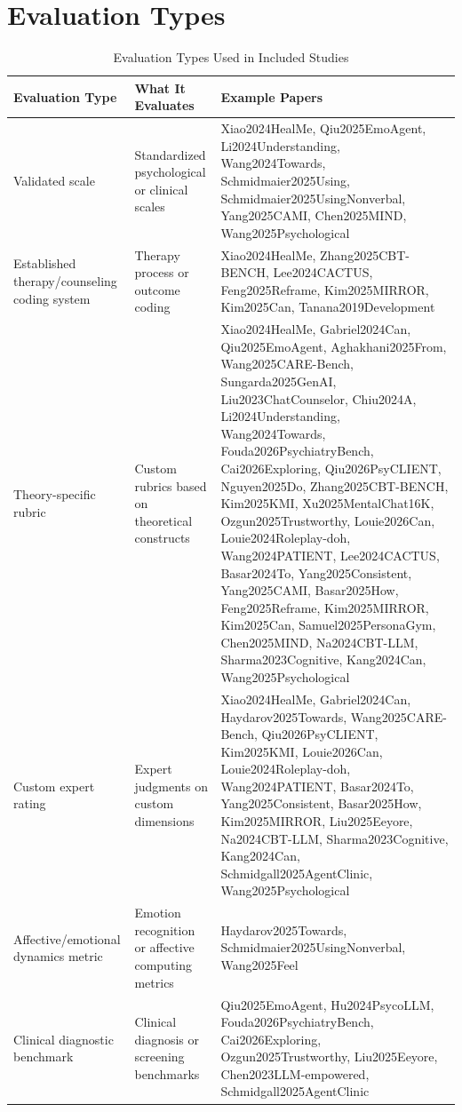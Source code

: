 \section{Evaluation Types}
\begin{table}[htbp]
\centering
\caption{Evaluation Types Used in Included Studies}
\label{tab:eval-types}
\small
\begin{tabular}{p{3.5cm}p{4.2cm}p{6.4cm}}
\toprule
\textbf{Evaluation Type} & \textbf{What It Evaluates} & \textbf{Example Papers} \\
\midrule
Validated scale & Standardized psychological or clinical scales & Xiao2024HealMe, Qiu2025EmoAgent, Li2024Understanding, Wang2024Towards, Schmidmaier2025Using, Schmidmaier2025UsingNonverbal, Yang2025CAMI, Chen2025MIND, Wang2025Psychological \\
Established therapy/counseling coding system & Therapy process or outcome coding & Xiao2024HealMe, Zhang2025CBT-BENCH, Lee2024CACTUS, Feng2025Reframe, Kim2025MIRROR, Kim2025Can, Tanana2019Development \\
Theory-specific rubric & Custom rubrics based on theoretical constructs & Xiao2024HealMe, Gabriel2024Can, Qiu2025EmoAgent, Aghakhani2025From, Wang2025CARE-Bench, Sungarda2025GenAI, Liu2023ChatCounselor, Chiu2024A, Li2024Understanding, Wang2024Towards, Fouda2026PsychiatryBench, Cai2026Exploring, Qiu2026PsyCLIENT, Nguyen2025Do, Zhang2025CBT-BENCH, Kim2025KMI, Xu2025MentalChat16K, Ozgun2025Trustworthy, Louie2026Can, Louie2024Roleplay-doh, Wang2024PATIENT, Lee2024CACTUS, Basar2024To, Yang2025Consistent, Yang2025CAMI, Basar2025How, Feng2025Reframe, Kim2025MIRROR, Kim2025Can, Samuel2025PersonaGym, Chen2025MIND, Na2024CBT-LLM, Sharma2023Cognitive, Kang2024Can, Wang2025Psychological \\
Custom expert rating & Expert judgments on custom dimensions & Xiao2024HealMe, Gabriel2024Can, Haydarov2025Towards, Wang2025CARE-Bench, Qiu2026PsyCLIENT, Kim2025KMI, Louie2026Can, Louie2024Roleplay-doh, Wang2024PATIENT, Basar2024To, Yang2025Consistent, Basar2025How, Kim2025MIRROR, Liu2025Eeyore, Na2024CBT-LLM, Sharma2023Cognitive, Kang2024Can, Schmidgall2025AgentClinic, Wang2025Psychological \\
Affective/emotional dynamics metric & Emotion recognition or affective computing metrics & Haydarov2025Towards, Schmidmaier2025UsingNonverbal, Wang2025Feel \\
Clinical diagnostic benchmark & Clinical diagnosis or screening benchmarks & Qiu2025EmoAgent, Hu2024PsycoLLM, Fouda2026PsychiatryBench, Cai2026Exploring, Ozgun2025Trustworthy, Liu2025Eeyore, Chen2023LLM-empowered, Schmidgall2025AgentClinic \\

\end{tabular}
\end{table}
